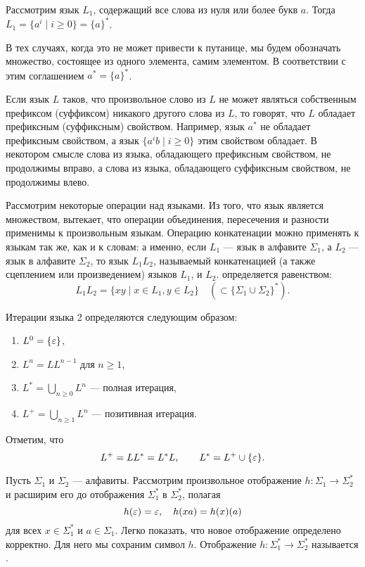 \begin{myexample}
Рассмотрим язык $L_{1}$, содержащий все слова из нуля или более букв $a$. Тогда $L_1=\{a^i\mid i\ge0\}=\{a\}^*$.
\end{myexample}

В тех случаях, когда это не может привести к путанице, мы будем обозначать множество, состоящее из одного элемента, самим элементом. В соответствии с этим соглашением $a^*=\{a\}^*$.

Если язык $L$ таков, что произвольное слово из $L$ не может являться собственным префиксом (суффиксом) никакого другого слова из $L$, то говорят, что $L$ обладает префиксным (суффиксным) свойством. Например, язык $a^*$ не обладает префиксным свойством, а язык $\{a^ib \mid i \ge 0\}$ этим свойством обладает. В некотором смысле слова из языка, обладающего префиксным свойством, не продолжимы вправо, а слова из языка, обладающего суффиксным свойством, не продолжимы влево.

Рассмотрим некоторые операции над языками. Из того, что язык является множеством, вытекает, что операции объединения, пересечения и разности применимы к произвольным языкам. Операцию конкатенации можно применять к языкам так же, как и к словам: а именно, если $L_1$ --- язык в алфавите $\Sigma_1$, а $L_2$ --- язык в алфавите $\Sigma_2$, то язык $L_1L_2$, называемый конкатенацией (а также сцеплением или произведением) языков $L_1$, и $L_2$. определяется равенством:
\[
	L_1L_2 = \{xy \mid x\in L_1, y\in L_2\} \quad  (\subset\{\Sigma_1\cup\Sigma_2\}^*).
\]

Итерации языка 2 определяются следующим образом:
\begin{enumerate}
\item $L^0 = \{\varepsilon\}$,
\item $L^n = LL^{n-1}$ для $n\ge1$,
\item $L^* = \bigcup_{n \ge 0} L^n$ --- полная итерация,
\item $L^+ = \bigcup_{n \ge 1}L^{n}$ --- позитивная итерация.
\end{enumerate}

Отметим, что
\[
	L^+ = LL^* = L^*L, \qquad  L^* = L^+\cup\{\varepsilon\}.
\]

Пусть $\Sigma_1$ и $\Sigma_2$ --- алфавиты. Рассмотрим произвольное
отображение $h\colon \Sigma_1 \to \Sigma_2^*$ и расширим его до
отображения $\Sigma_1^*$ в $\Sigma_2^*$, полагая
\[
    h(\varepsilon)=\varepsilon, \quad h(xa)=h(x)(a)
\]
для всех $x\in\Sigma_1^*$ и $a\in\Sigma_1$. Легко
показать, что новое отображение определено корректно. Для него мы
сохраним символ $h$. Отображение $h\colon  \Sigma_1^*\to\Sigma_2^*$
называется .

